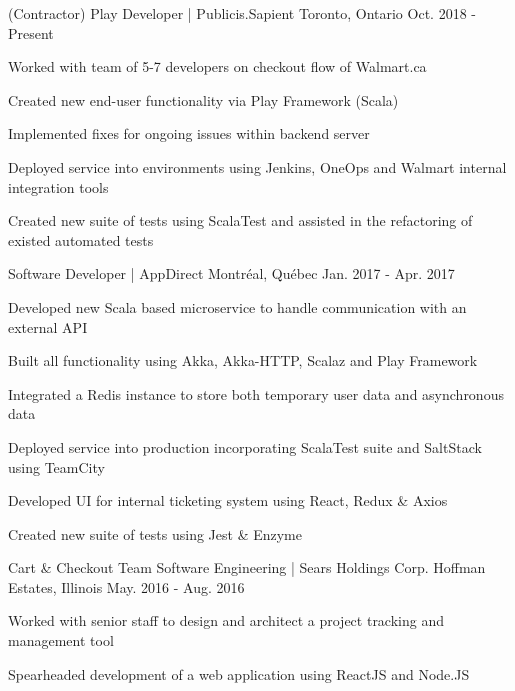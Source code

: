 \begin{cventries}
    {(Contractor) Play Developer | Publicis.Sapient}
    {Toronto, Ontario}
    {Oct. 2018 - Present}
    {
      \begin{cvitems}
        \item {Worked with team of 5-7  developers on checkout flow of Walmart.ca}
        \item {Created new end-user functionality via Play Framework (Scala) }
        \item {Implemented fixes for ongoing issues within backend server}
        \item {Deployed service into environments using Jenkins, OneOps and Walmart internal integration tools}
        \item {Created new suite of tests using ScalaTest and assisted in the refactoring of existed automated tests}
      \end{cvitems}
    }
    {\vspace{-3mm}Software Developer | AppDirect}
    {Montréal, Québec}
    {Jan. 2017 - Apr. 2017 }
    {
      \begin{cvitems}
        \item {Developed new Scala based microservice to handle communication with an external API}
        \item {Built all functionality using Akka, Akka-HTTP, Scalaz and Play Framework}
        \item {Integrated a Redis instance to store both temporary user data and asynchronous data}
        \item {Deployed service into production incorporating ScalaTest suite and SaltStack using TeamCity}
        \item {Developed UI for internal ticketing system using React, Redux \& Axios}
        \item {Created new suite of tests using Jest \& Enzyme}
      \end{cvitems}
    }
    \cventry
    {Cart \& Checkout Team}
    {Software Engineering | Sears Holdings Corp.}
    {Hoffman Estates, Illinois}
    {May. 2016 - Aug. 2016}
    {
      \begin{cvitems}
        \item {Worked with senior staff to design and architect a project tracking and management tool}
       \item {Spearheaded development of a web application using ReactJS and Node.JS}

\end{cvitems}}
\end{cventries}
